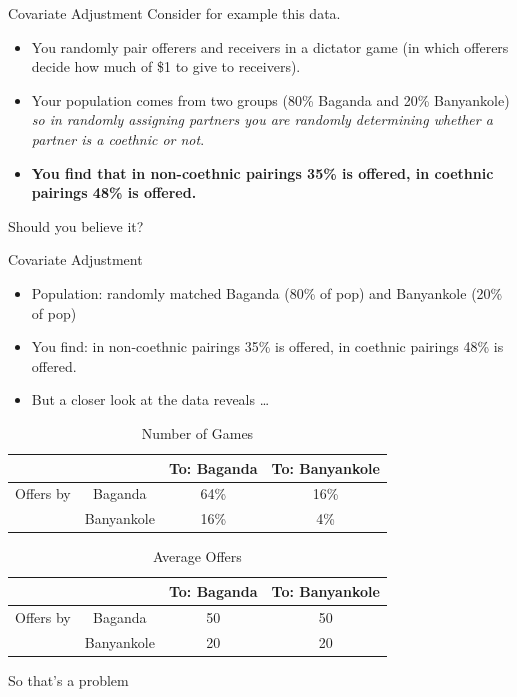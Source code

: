 \documentclass[
  11pt,
  ignorenonframetext,
]{beamer}
\providecommand{\tightlist}{%
  \setlength{\itemsep}{0pt}\setlength{\parskip}{0pt}}\usepackage{longtable,booktabs,array}
\begin{document}
\begin{frame}{Covariate Adjustment\label{CA}}
\protect\hypertarget{covariate-adjustment}{}
Consider for example this data. \bigskip

\begin{itemize}
\tightlist
\item
  You randomly pair offerers and receivers in a dictator game (in which
  offerers decide how much of \$1 to give to receivers).
\item
  Your population comes from two groups (80\% Baganda and 20\%
  Banyankole) \emph{so in randomly assigning partners you are randomly
  determining whether a partner is a coethnic or not}.
\item
  \textbf{You find that in non-coethnic pairings 35\% is offered, in
  coethnic pairings 48\% is offered.}
\end{itemize}

Should you believe it?
\end{frame}

\begin{frame}{Covariate Adjustment}
\protect\hypertarget{covariate-adjustment-1}{}
\begin{itemize}
\tightlist
\item
  Population: randomly matched Baganda (80\% of pop) and Banyankole
  (20\% of pop)
\item
  You find: in non-coethnic pairings 35\% is offered, in coethnic
  pairings 48\% is offered.
\item
  But a closer look at the data reveals \dots
\end{itemize}

\begin{table}[h!]    \footnotesize
    \begin{tabular}{cc|cc}  \footnotesize
&   &       To: Baganda &To: Banyankole \\ \hline
Offers by   &Baganda    &64\%   & 16\% \\
    &Banyankole &16\%   &4\% \\
    \end{tabular}
    \caption{\small Number of Games}
\end{table}

\begin{table}[h!]    \footnotesize
    \begin{tabular}{cc|cc} \footnotesize
&   &       To: Baganda &To: Banyankole \\ \hline
Offers by   &Baganda    &50 & 50 \\
    &Banyankole &20 &20 \\
    \end{tabular}
    \caption{\small  Average Offers}
\end{table}

\footnotesize So that's a problem
\end{frame}
\end{document}

